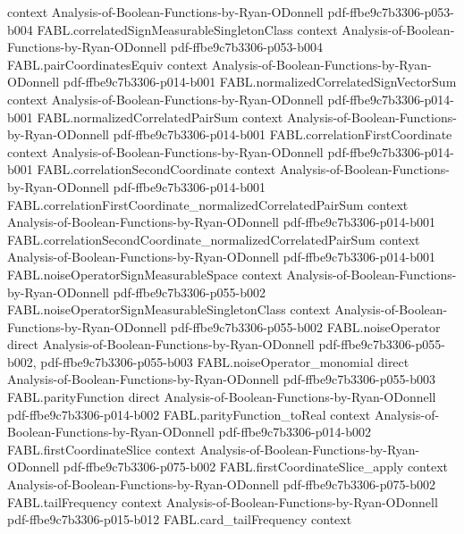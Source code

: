 \begin{theorem}
  {context}
  {Analysis-of-Boolean-Functions-by-Ryan-ODonnell}
  {pdf-ffbe9c7b3306-p053-b004}
\proofstep
  {FABL.correlatedSignMeasurableSingletonClass}
  {context}
  {Analysis-of-Boolean-Functions-by-Ryan-ODonnell}
  {pdf-ffbe9c7b3306-p053-b004}
\proofstep
  {FABL.pairCoordinatesEquiv}
  {context}
  {Analysis-of-Boolean-Functions-by-Ryan-ODonnell}
  {pdf-ffbe9c7b3306-p014-b001}
\proofstep
  {FABL.normalizedCorrelatedSignVectorSum}
  {context}
  {Analysis-of-Boolean-Functions-by-Ryan-ODonnell}
  {pdf-ffbe9c7b3306-p014-b001}
\proofstep
  {FABL.normalizedCorrelatedPairSum}
  {context}
  {Analysis-of-Boolean-Functions-by-Ryan-ODonnell}
  {pdf-ffbe9c7b3306-p014-b001}
\proofstep
  {FABL.correlationFirstCoordinate}
  {context}
  {Analysis-of-Boolean-Functions-by-Ryan-ODonnell}
  {pdf-ffbe9c7b3306-p014-b001}
\proofstep
  {FABL.correlationSecondCoordinate}
  {context}
  {Analysis-of-Boolean-Functions-by-Ryan-ODonnell}
  {pdf-ffbe9c7b3306-p014-b001}
\proofstep
  {FABL.correlationFirstCoordinate_normalizedCorrelatedPairSum}
  {context}
  {Analysis-of-Boolean-Functions-by-Ryan-ODonnell}
  {pdf-ffbe9c7b3306-p014-b001}
\proofstep
  {FABL.correlationSecondCoordinate_normalizedCorrelatedPairSum}
  {context}
  {Analysis-of-Boolean-Functions-by-Ryan-ODonnell}
  {pdf-ffbe9c7b3306-p014-b001}
\proofstep
  {FABL.noiseOperatorSignMeasurableSpace}
  {context}
  {Analysis-of-Boolean-Functions-by-Ryan-ODonnell}
  {pdf-ffbe9c7b3306-p055-b002}
\proofstep
  {FABL.noiseOperatorSignMeasurableSingletonClass}
  {context}
  {Analysis-of-Boolean-Functions-by-Ryan-ODonnell}
  {pdf-ffbe9c7b3306-p055-b002}
\proofstep
  {FABL.noiseOperator}
  {direct}
  {Analysis-of-Boolean-Functions-by-Ryan-ODonnell}
  {pdf-ffbe9c7b3306-p055-b002,
    pdf-ffbe9c7b3306-p055-b003}
\proofstep
  {FABL.noiseOperator_monomial}
  {direct}
  {Analysis-of-Boolean-Functions-by-Ryan-ODonnell}
  {pdf-ffbe9c7b3306-p055-b003}
\proofstep
  {FABL.parityFunction}
  {direct}
  {Analysis-of-Boolean-Functions-by-Ryan-ODonnell}
  {pdf-ffbe9c7b3306-p014-b002}
\proofstep
  {FABL.parityFunction_toReal}
  {context}
  {Analysis-of-Boolean-Functions-by-Ryan-ODonnell}
  {pdf-ffbe9c7b3306-p014-b002}
\proofstep
  {FABL.firstCoordinateSlice}
  {context}
  {Analysis-of-Boolean-Functions-by-Ryan-ODonnell}
  {pdf-ffbe9c7b3306-p075-b002}
\proofstep
  {FABL.firstCoordinateSlice_apply}
  {context}
  {Analysis-of-Boolean-Functions-by-Ryan-ODonnell}
  {pdf-ffbe9c7b3306-p075-b002}
\proofstep
  {FABL.tailFrequency}
  {context}
  {Analysis-of-Boolean-Functions-by-Ryan-ODonnell}
  {pdf-ffbe9c7b3306-p015-b012}
\proofstep
  {FABL.card_tailFrequency}
  {context}

\end{theorem}
